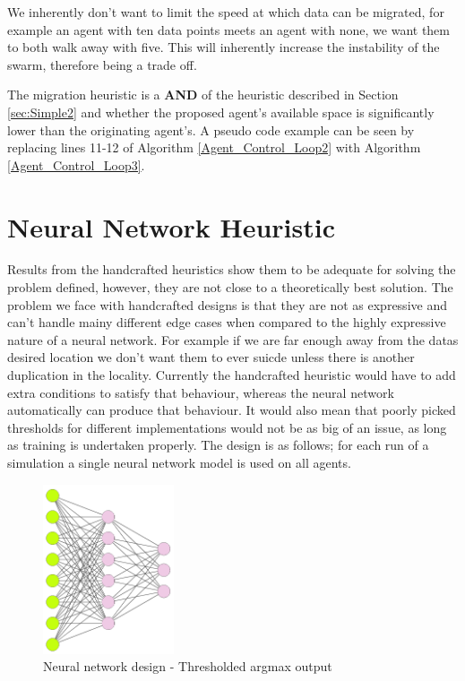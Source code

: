 \documentclass{UoYCSproject}
\begin{document}
We inherently don’t want to limit the speed at which data can be migrated, for example an agent with ten data points meets an agent with none, we want them to both walk away with five. 
This will inherently increase the instability of the swarm, therefore being a trade off.

The migration heuristic is a \textbf{AND} of the heuristic described in Section \ref{sec:Simple2} and whether the proposed agent's available space is significantly lower than the originating agent’s. 
A pseudo code example can be seen by replacing lines 11-12 of Algorithm \ref{Agent_Control_Loop2} with Algorithm \ref{Agent_Control_Loop3}.


\section{Neural Network Heuristic}
\label{sec:Simple5}

Results from the handcrafted heuristics show them to be adequate for solving the problem defined, however, they are not close to a theoretically best solution. The problem we face with handcrafted designs is that they are not as expressive and can’t handle mainy different edge cases when compared to the highly expressive nature of a neural network. For example if we are far enough away from the datas desired location we don’t want them to ever suicde unless there is another duplication in the locality. Currently the handcrafted heuristic would have to add extra conditions to satisfy that behaviour, whereas the neural network automatically can produce that behaviour. It would also mean that poorly picked thresholds for different implementations would not be as big of an issue, as long as training is undertaken properly. The design is as follows; for each run of a simulation a single neural network model is used on all agents.

\begin{figure}[htb]
\label{fig:Neural network}
\begin{center}
\centering
\includegraphics[height=5cm]{"./ExplanationImgs/NN.png"}
\caption{Neural network design - Thresholded argmax output}
\end{center}
\end{figure}
\end{document}
